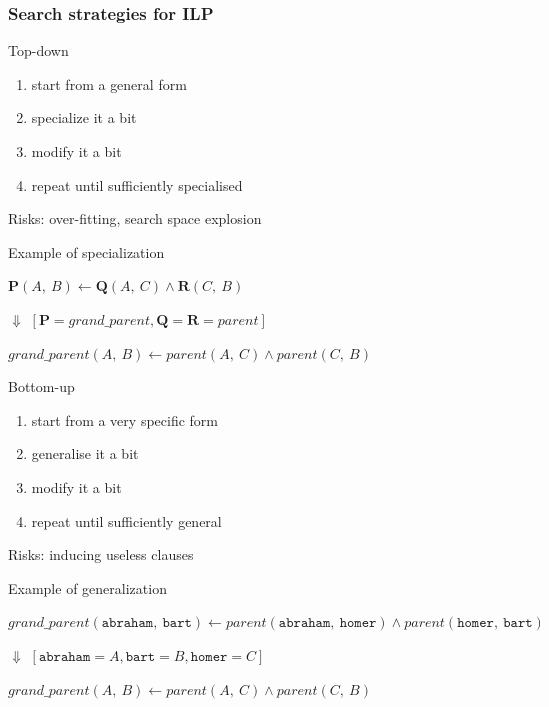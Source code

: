 \documentclass[presentation]{beamer}\mode<presentation>{\usetheme{AMSBolognaFC}}
\begin{document}
\begin{frame}[allowframebreaks]
    \frametitle{Search strategies for ILP}
    \begin{block}{Top-down}
        \begin{enumerate}
            \item start from a \alert{general} form 
            \item \alert{specialize} it a bit
            \item modify it a bit
            \item repeat until sufficiently specialised
        \end{enumerate}
        \medskip
        Risks: \alert{over-fitting}, search space explosion
    \end{block}

    \begin{exampleblock}{Example of specialization}
        \begin{center}
            $\mathbf{P}(A,\ B) \leftarrow \mathbf{Q}(A,\ C) \wedge \mathbf{R}(C,\ B)$

            \qquad \qquad $\Downarrow$ { \tiny $[\mathbf{P} = \textit{grand\_parent}, \mathbf{Q} = \mathbf{R} = \textit{parent}]$}

            $\textit{grand\_parent}(A,\ B) \leftarrow \textit{parent}(A,\ C) \wedge \textit{parent}(C,\ B)$
        \end{center}
    \end{exampleblock}

    \begin{block}{Bottom-up}
        \begin{enumerate}
            \item start from a very \alert{specific} form
            \item \alert{generalise} it a bit
            \item modify it a bit
            \item repeat until sufficiently general
        \end{enumerate}
        \medskip
        Risks: inducing useless clauses 
    \end{block}

    \begin{exampleblock}{Example of generalization}
        \begin{center}\footnotesize
            $\textit{grand\_parent}(\texttt{abraham},\ \texttt{bart}) \leftarrow \textit{parent}(\texttt{abraham},\ \texttt{homer}) \wedge \textit{parent}(\texttt{homer},\ \texttt{bart})$
            
            \normalsize
            \qquad \qquad $\Downarrow$ { \tiny $[\texttt{abraham} = A, \texttt{bart} = B, \texttt{homer} = C]$}

            $\textit{grand\_parent}(A,\ B) \leftarrow \textit{parent}(A,\ C) \wedge \textit{parent}(C,\ B)$
        \end{center}
    \end{exampleblock}

\end{frame}
\end{document}
